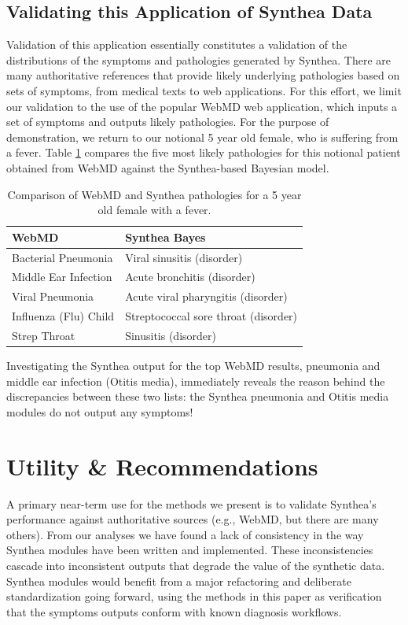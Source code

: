 \documentclass[11pt]{article}
\begin{document}
\subsection{Validating this Application of Synthea Data}

Validation of this application essentially constitutes a validation of the distributions of the symptoms and pathologies generated by Synthea.  There are many authoritative references that provide likely underlying pathologies based on sets of symptoms, from medical texts to web applications.  For this effort, we limit our validation to the use of the popular WebMD \citep{webmd} web application, which inputs a set of symptoms and outputs likely pathologies.  For the purpose of demonstration, we return to our notional 5 year old female, who is suffering from a fever.  Table \ref{table: validate} compares the five most likely pathologies for this notional patient obtained from WebMD against the Synthea-based Bayesian model.

\begin{table}[!hbt]\centering
\begin{tabular}{l|l}
WebMD & Synthea Bayes \\ \hline
Bacterial Pneumonia & Viral sinusitis (disorder) \\
Middle Ear Infection & Acute bronchitis (disorder) \\
Viral Pneumonia & Acute viral pharyngitis (disorder) \\
Influenza (Flu) Child & Streptococcal sore throat (disorder) \\
Strep Throat & Sinusitis (disorder) \\
\end{tabular}
\caption{Comparison of WebMD and Synthea pathologies for a 5 year old female with a fever.
\label{table: validate}}
\end{table}

Investigating the Synthea output for the top WebMD results, pneumonia and middle ear infection (Otitis media), immediately reveals the reason behind the discrepancies between these two lists: the Synthea pneumonia and Otitis media modules do not output any symptoms!  

\section{Utility \& Recommendations}

A primary near-term use for the methods we present is to validate Synthea's performance against authoritative sources (e.g., WebMD, but there are many others).  From our analyses we have found a lack of consistency in the way Synthea modules have been written and implemented.  These inconsistencies cascade into inconsistent outputs that degrade the value of the synthetic data.  Synthea modules would benefit from a major refactoring and deliberate standardization going forward, using the methods in this paper as verification that the symptoms outputs conform with known diagnosis workflows.
\end{document}
